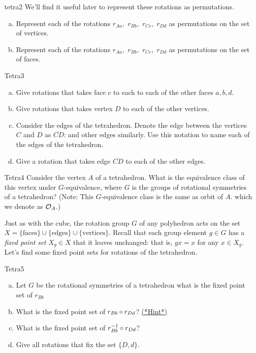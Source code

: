 \begin{exercise}{tetra2}
We'll find it useful later to represent these rotations as permutations.
\begin{enumerate}[(a)] 
\item Represent each of the rotations $r_{Aa},$ $r_{Bb},$ $r_{Cc},$ $r_{Dd}$ as permutations on the set of vertices.
\item Represent each of the rotations $r_{Aa},$ $r_{Bb},$ $r_{Cc},$ $r_{Dd}$ as permutations on the set of faces.
\end{enumerate}
\end {exercise}
\begin{exercise}{Tetra3}
\begin{enumerate}[(a)]
\item Give rotations that takes face $c$ to each to each of the other faces $a, b, d$.
\item Give rotations that takes vertex $D$ to each of the other vertices.
\item Consider the edges of the tetrahedron.  Denote the edge between the vertices $C$ and $D$ as $\overline{CD}$: and other edges similarly.  Use this notation to name each of the edges of the tetrahedron.
 \item Give a rotation that takes edge $\overline{CD}$ to each of the other edges.
\end{enumerate}
\end{exercise} 
\begin{exercise}{Tetra4}
Consider the vertex $A$ of a tetrahedron.  What is the equivalence class of this vertex under $G$-equivalence, where $G$ is the groups of rotational symmetries of a tetrahedron?   (Note:  This $G$-equivalence class is the same as orbit of $A$. which we denote as ${\cal O}_A$.)
\end {exercise}


Just as with the cube, the rotation group $G$ of any polyhedron acts on the set $X=\{\text{faces}\}\cup\{\text{edges}\}\cup\{\text{vertices}\}$. Recall that each group element $g\in G$ has a \emph{fixed point set} $X_g\in X$ that it leaves unchanged: that is, $gx=x$ for any $x\in X_g$. Let's find some fixed point sets for rotations of the tetrahedron.

\begin{exercise}{Tetra5}
\begin{enumerate}[(a)]
\item Let $G$ be the rotational symmetries of a tetrahedron what is the fixed point set of $r_{Bb}$
\item What is the fixed point set of $r_{Bb}\circ r_{Dd}$? 
\hyperref[sec:actions:hints]{(*Hint*)}
\item What is the fixed point set of $r_{Bb}^{-1}\circ r_{Dd}$?
\item Give all rotations that fix the set $\{D,d\}$. 
\end{enumerate}
\end {exercise}

